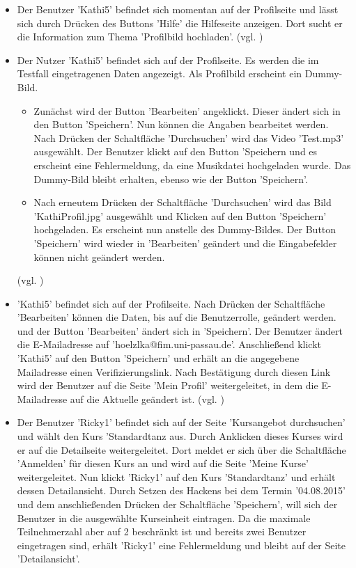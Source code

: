 \documentclass[a4paper]{scrreprt}
\begin{document}
\begin{itemize}
				\item {}
				Der Benutzer 'Kathi5' befindet sich momentan auf der Profilseite und lässt sich durch Drücken des Buttons 'Hilfe' die Hilfeseite anzeigen. Dort sucht er die Information zum Thema 'Profilbild hochladen'. (vgl. )
					
				\item {}
				Der Nutzer 'Kathi5' befindet sich auf der Profilseite. Es werden die im Testfall  eingetragenen Daten angezeigt. Als Profilbild erscheint ein Dummy-Bild. 
					\begin{itemize}
						\item Zunächst wird der Button 'Bearbeiten' angeklickt. Dieser ändert sich in den Button 'Speichern'. Nun können die Angaben bearbeitet werden. Nach Drücken der Schaltfläche 'Durchsuchen' wird das Video 'Test.mp3' ausgewählt. Der Benutzer klickt auf den Button 'Speichern und es erscheint eine Fehlermeldung, da eine Musikdatei hochgeladen wurde. Das Dummy-Bild bleibt erhalten, ebenso wie der Button 'Speichern'.
						\item Nach erneutem Drücken der Schaltfläche 'Durchsuchen' wird das Bild 'KathiProfil.jpg' ausgewählt und Klicken auf den Button 'Speichern' hochgeladen. Es erscheint nun anstelle des Dummy-Bildes.	Der Button 'Speichern' wird wieder in 'Bearbeiten' geändert und die Eingabefelder können nicht geändert werden.	
					\end{itemize}
				(vgl. )
									
				\item {}
				'Kathi5' befindet sich auf der Profilseite. Nach Drücken der Schaltfläche 'Bearbeiten' können die Daten, bis auf die Benutzerrolle, geändert werden. und der Button 'Bearbeiten' ändert sich in 'Speichern'. Der Benutzer ändert die E-Mailadresse auf 'hoelzlka@fim.uni-passau.de'. Anschließend klickt 'Kathi5' auf den Button 'Speichern' und erhält an die angegebene Mailadresse einen Verifizierungslink. Nach Bestätigung durch diesen Link wird der Benutzer auf die Seite 'Mein Profil' weitergeleitet, in dem die E-Mailadresse auf die Aktuelle geändert ist. (vgl. )
				
				\item {}
				Der Benutzer 'Ricky1' befindet sich auf der Seite 'Kursangebot durchsuchen' und wählt den Kurs 'Standardtanz aus. Durch Anklicken dieses Kurses wird er auf die Detailseite weitergeleitet. Dort meldet er sich über die Schaltfläche 'Anmelden' für diesen Kurs an und wird auf die Seite 'Meine Kurse' weitergeleitet. Nun klickt 'Ricky1' auf den Kurs 'Standardtanz' und erhält dessen Detailansicht. Durch Setzen des Hackens bei dem Termin '04.08.2015' und dem anschließenden Drücken der Schaltfläche 'Speichern', will sich der Benutzer in die ausgewählte Kurseinheit eintragen. Da die maximale Teilnehmerzahl aber auf 2 beschränkt ist und bereits zwei Benutzer eingetragen sind, erhält 'Ricky1' eine Fehlermeldung und bleibt auf der Seite 'Detailansicht'.
				

\end{itemize}
\end{document}
